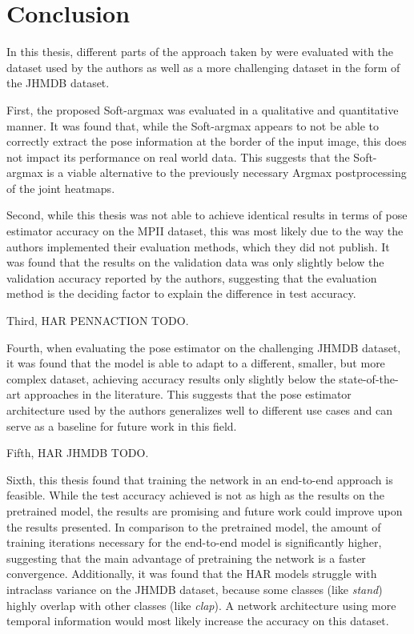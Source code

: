 \chapter{Conclusion}
\label{sec:chapter6}
In this thesis, different parts of the approach taken by \cite{luvizon_2d/3d_2018} were evaluated with the dataset used by the authors as well as a more challenging dataset in the form of the JHMDB dataset.

First, the proposed Soft-argmax was evaluated in a qualitative and quantitative manner.
It was found that, while the Soft-argmax appears to not be able to correctly extract the pose information at the border of the input image, this does not impact its performance on real world data.
This suggests that the Soft-argmax is a viable alternative to the previously necessary Argmax postprocessing of the joint heatmaps.

Second, while this thesis was not able to achieve identical results in terms of pose estimator accuracy on the MPII dataset, this was most likely due to the way the authors implemented their evaluation methods, which they did not publish.
It was found that the results on the validation data was only slightly below the validation accuracy reported by the authors, suggesting that the evaluation method is the deciding factor to explain the difference in test accuracy.

Third, HAR PENNACTION TODO.

Fourth, when evaluating the pose estimator on the challenging JHMDB dataset, it was found that the model is able to adapt to a different, smaller, but more complex dataset, achieving accuracy results only slightly below the state-of-the-art approaches in the literature.
This suggests that the pose estimator architecture used by the authors generalizes well to different use cases and can serve as a baseline for future work in this field.

Fifth, HAR JHMDB TODO.

Sixth, this thesis found that training the network in an end-to-end approach is feasible.
While the test accuracy achieved is not as high as the results on the pretrained model, the results are promising and future work could improve upon the results presented.
In comparison to the pretrained model, the amount of training iterations necessary for the end-to-end model is significantly higher, suggesting that the main advantage of pretraining the network is a faster convergence.
Additionally, it was found that the HAR models struggle with intraclass variance on the JHMDB dataset, because some classes (like \textit{stand}) highly overlap with other classes (like \textit{clap}).
A network architecture using more temporal information would most likely increase the accuracy on this dataset.

